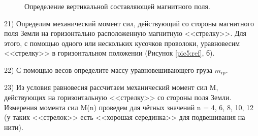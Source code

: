\documentclass[a4paper,12pt]{article} %
\begin{document}
\begin{figure}[H]
\noindent{}
\caption{Определение вертикальной составляющей магнитного поля.}
\label{pic5:ref}
\end{figure}

21) Определим механический момент сил, действующий со стороны магнитного поля Земли на горизонтально расположенную магнитную <<стрелку>>. Для этого, с помощью одного или нескольких кусочков проволоки, уравновесим <<стрелку>> в горизонтальном положении (Рисунок \eqref{pic5:ref}, б).

22) С помощью весов определите массу уравновешивающего груза $m_\text{гр}$.

23) Из условия равновесия рассчитаем механический момент сил M, действующих на горизонтальную <<стрелку>> со стороны поля Земли. Измерения момента сил M(n) проведем для чётных значений n = 4, 6, 8, 10, 12 (у таких <<стрелок>> есть <<хорошая серединка>> для подвешивания на нити).
\end{document}
